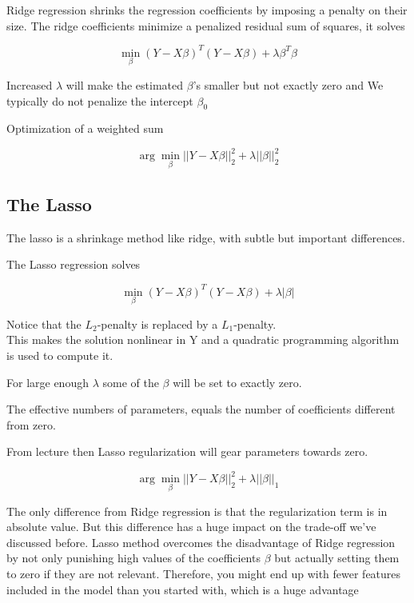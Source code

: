 Ridge regression shrinks the regression coefficients by imposing a penalty on their size. The ridge coefficients minimize a penalized residual sum of squares, it solves\cite[p.~61]{friedman2016elements}

\[
    \min\limits_\beta (Y - X \beta)^T (Y - X \beta) + \lambda \beta^T \beta
\]

Increased $\lambda$ will make the estimated $\beta$'s smaller but not exactly zero and We typically do not penalize the intercept $\beta_0$ \cite[p.~23]{lecture3}

Optimization of a weighted sum

\[
    \arg \min\limits_\beta || Y - X \beta ||^2_2 + \lambda ||\beta||^2_2
\]


\subsection{The Lasso}

The lasso is a shrinkage method like ridge, with subtle but important differences. \cite[p.~68]{friedman2016elements}

The Lasso regression solves

\[
    \min\limits_\beta (Y - X \beta)^T (Y - X \beta) + \lambda | \beta|
\]

Notice that the $L_2$-penalty is replaced by a $L_1$-penalty.\\

This makes the solution nonlinear in Y and a quadratic
programming algorithm is used to compute it.

For large enough $\lambda$ some of the $\beta$ will be set to exactly zero.

The effective numbers of parameters, equals the number of coefficients different from zero.

From lecture \cite[p.~27]{lecture3} then Lasso regularization will gear parameters towards zero.

\[
    \arg \min\limits_\beta || Y - X \beta ||^2_2 + \lambda ||\beta||_1
\]

The only difference from Ridge regression is that the regularization term is in absolute value. But this difference has a huge impact on the trade-off we’ve discussed before. Lasso method overcomes the disadvantage of Ridge regression by not only punishing high values of the coefficients $\beta$ but actually setting them to zero if they are not relevant. Therefore, you might end up with fewer features included in the model than you started with, which is a huge advantage

